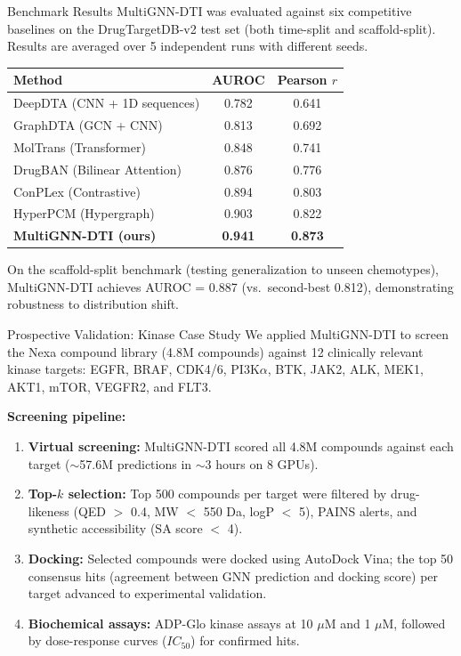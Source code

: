 \documentclass[20pt,landscape]{extarticle}
\begin{document}
\hfill
\begin{minipage}[t]{0.325\textwidth}
\RaggedRight

\begin{posterblockcoral}{Benchmark Results}
MultiGNN-DTI was evaluated against six competitive baselines on the DrugTargetDB-v2 test set
(both time-split and scaffold-split). Results are averaged over 5 independent runs with different seeds.

\vspace{4pt}
\begin{tabularx}{\linewidth}{@{}lcc@{}}
\toprule
\rule{0pt}{14pt}\textbf{Method} & \textbf{AUROC} & \textbf{Pearson $r$} \\
\midrule
DeepDTA (CNN + 1D sequences) & 0.782 & 0.641 \\
GraphDTA (GCN + CNN) & 0.813 & 0.692 \\
MolTrans (Transformer) & 0.848 & 0.741 \\
DrugBAN (Bilinear Attention) & 0.876 & 0.776 \\
ConPLex (Contrastive) & 0.894 & 0.803 \\
HyperPCM (Hypergraph) & 0.903 & 0.822 \\
\rowcolor{lightbg}\textbf{MultiGNN-DTI (ours)} & \textbf{0.941} & \textbf{0.873} \\
\bottomrule
\end{tabularx}

\vspace{8pt}
On the scaffold-split benchmark (testing generalization to unseen chemotypes), MultiGNN-DTI achieves
AUROC = 0.887 (vs.\ second-best 0.812), demonstrating robustness to distribution shift.
\end{posterblockcoral}

\begin{posterblockteal}{Prospective Validation: Kinase Case Study}
We applied MultiGNN-DTI to screen the Nexa compound library (4.8M compounds) against 12 clinically
relevant kinase targets: EGFR, BRAF, CDK4/6, PI3K$\alpha$, BTK, JAK2, ALK, MEK1, AKT1, mTOR, VEGFR2, and FLT3.

\vspace{4pt}
\textbf{Screening pipeline:}
\begin{enumerate}[leftmargin=*,nosep]
  \item \textbf{Virtual screening:} MultiGNN-DTI scored all 4.8M compounds against each target
        ($\sim$57.6M predictions in $\sim$3 hours on 8 GPUs).
  \item \textbf{Top-$k$ selection:} Top 500 compounds per target were filtered by drug-likeness
        (QED $>$ 0.4, MW $<$ 550 Da, logP $<$ 5), PAINS alerts, and synthetic accessibility (SA score $<$ 4).
  \item \textbf{Docking:} Selected compounds were docked using AutoDock Vina; the top 50 consensus hits
        (agreement between GNN prediction and docking score) per target advanced to experimental validation.
  \item \textbf{Biochemical assays:} ADP-Glo kinase assays at 10 $\mu$M and 1 $\mu$M, followed by
        dose-response curves ($IC_{50}$) for confirmed hits.
\end{enumerate}


\end{posterblockteal}
\end{minipage}
\end{document}
